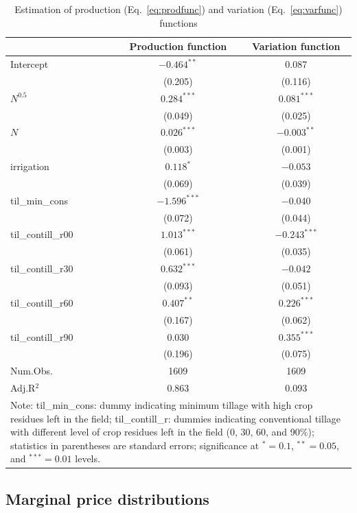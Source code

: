 \documentclass[12pt,a4paper]{article}
\begin{document}
\begin{table}[H]
\centering
\caption{Estimation of production (Eq.~\ref{eq:prodfunc}) and variation (Eq.~\ref{eq:varfunc}) functions}
\label{tab:prodfunc}
\begin{tabular}{lcc}
\toprule
 & Production function & Variation function \\
\midrule
Intercept & $-0.464^{**}$ & 0.087 \\
 & (0.205) & (0.116) \\
$N^{0.5}$ & $0.284^{***}$ & $0.081^{***}$ \\
 & (0.049) & (0.025) \\
$N$ & $0.026^{***}$ & $-0.003^{**}$ \\
 & (0.003) & (0.001) \\
irrigation & $0.118^{*}$ & $-0.053$ \\
 & (0.069) & (0.039) \\
til\_min\_cons & $-1.596^{***}$ & $-0.040$ \\
 & (0.072) & (0.044) \\
til\_contill\_r00 & $1.013^{***}$ & $-0.243^{***}$ \\
 & (0.061) & (0.035) \\
til\_contill\_r30 & $0.632^{***}$ & $-0.042$ \\
 & (0.093) & (0.051) \\
til\_contill\_r60 & $0.407^{**}$ & $0.226^{***}$ \\
 & (0.167) & (0.062) \\
til\_contill\_r90 & 0.030 & $0.355^{***}$ \\
 & (0.196) & (0.075) \\
\midrule
Num.Obs. & 1609 & 1609 \\
Adj.R$^2$ & 0.863 & 0.093 \\
\bottomrule
\multicolumn{3}{p{12cm}}{\footnotesize Note: til\_min\_cons: dummy indicating minimum tillage with high crop residues left in the field; til\_contill\_r: dummies indicating conventional tillage with different level of crop residues left in the field (0, 30, 60, and 90\%); statistics in parentheses are standard errors; significance at $^{*} = 0.1$, $^{**} = 0.05$, and $^{***} = 0.01$ levels.}
\end{tabular}
\end{table}

\subsection{Marginal price distributions}
\end{document}
